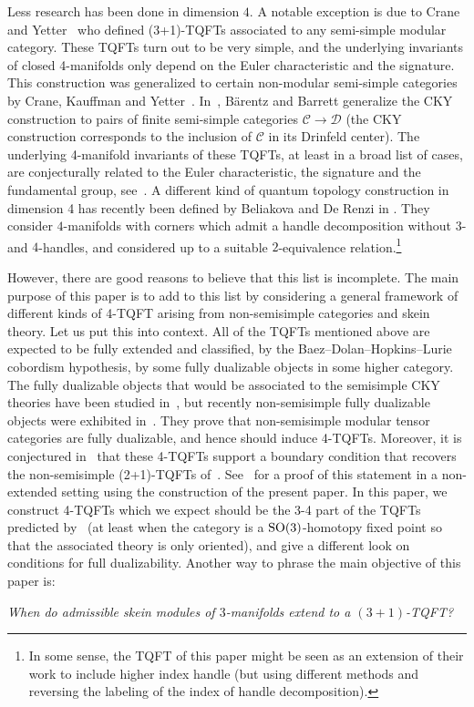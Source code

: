 \documentclass[10pt,a4paper]{amsart}
\numberwithin{equation}{section}
\numberwithin{theorem}{section}
\numberwithin{proposition}{section}
\numberwithin{definition}{section}
\numberwithin{lemma}{section}
\numberwithin{corollary}{section}
\numberwithin{remark}{section}
\numberwithin{example}{section}
\newcommand{\cat}{\mathcal{C}}
\newcommand{\catd}{\mathcal{D}}
\begin{document}
Less research has been done in dimension $4$. A notable exception is due to Crane and Yetter~\cite{CY}
who defined (3+1)-TQFTs associated to any semi-simple modular category. These TQFTs turn out to be very simple, and the underlying invariants of closed 4-manifolds only depend on the Euler characteristic
and
the signature.
This construction was generalized to certain non-modular semi-simple categories by Crane, Kauffman and Yetter~\cite{CYK}. In~\cite{BB18}, B\"arentz and Barrett generalize the CKY construction to pairs of finite semi-simple categories $\cat \to \catd$ (the CKY construction corresponds to the inclusion of $\cat$ in its Drinfeld center). The underlying 4-manifold invariants of these TQFTs, at least in a broad list of cases, are conjecturally related to the Euler characteristic, the signature and the fundamental group, see~\cite[Conjecture~8.1]{BB18}.
A different kind of quantum topology construction in dimension 4 has
recently been defined by Beliakova and De Renzi in
\cite{BD22, BD21}.
They consider $4$-manifolds with corners which admit a handle decomposition without
$3$- and $4$-handles, and considered up to a suitable $2$-equivalence
relation.\footnote{In some sense, the TQFT of this paper might be seen as
 an extension of their work to include higher index handle (but using
 different methods and reversing the labeling of the index of handle decomposition).}

However, there are good reasons to believe that this list is incomplete.
The main purpose of this paper is to add to this list by considering a general framework of different kinds of 4-TQFT arising from non-semisimple categories and skein theory. Let us put this into context.
All
of
the TQFTs mentioned above are expected to be fully extended and classified, by the Baez--Dolan--Hopkins--Lurie cobordism hypothesis, by some fully dualizable objects in some higher category. The fully dualizable objects that would be associated to the semisimple CKY theories have been studied in~\cite{BJS}, but recently non-semisimple fully dualizable objects were exhibited in~\cite{BJSS}. They prove that non-semisimple modular tensor categories are fully dualizable, and hence should induce 4-TQFTs. Moreover, it is conjectured in~\cite{Haioun} that these 4-TQFTs support a boundary condition that recovers the non-semisimple (2+1)-TQFTs of~\cite{DRGGPMR2022}. See~\cite{HaiounWRT} for a proof of this statement in a non-extended setting using the construction of the present paper.
In this paper, we construct 4-TQFTs which
we expect should be the 3-4 part of
the TQFTs predicted by~\cite{BJSS}
(at least when the category is a ${\rm SO}(3)$-homotopy fixed point so that the associated theory is only oriented),
and give a different look on conditions for full dualizability.
Another way to phrase the main objective of this paper is:
\begin{center}
 \it When do admissible skein modules of $3$-manifolds extend to a $(3+1)$-TQFT?
\end{center}
\end{document}
